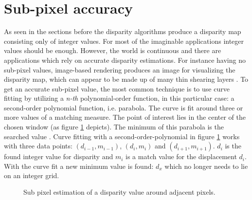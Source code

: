 \section{Sub-pixel accuracy}

As seen in the sections before the disparity algorithms produce a disparity map consisting only of integer values.
For most of the imaginable applications integer values should be enough.
However, the world is continuous and there are applications which rely on accurate disparity estimations.
For instance having no sub-pixel values, image-based rendering produces an image for visualizing the disparity map, which can appear to be made up of many thin shearing layers \citep{scharstein2002taxonomy}.
To get an accurate sub-pixel value, the most common technique is to use curve fitting by utilizing a \textit{n-th} polynomial-order function, in this particular case: a second-order polynomial function, i.e. parabola.
The curve is fit around three or more values of a matching measure.
The point of interest lies in the center of the chosen window (as figure \ref{fig:sub-pixel-estimation} depicts).
The minimum of this parabola is the searched value \citep{cyganek2011introduction, scharstein2014high}.
\newline\newline\noindent Curve fitting with a second-order-polynomial in figure \ref{fig:sub-pixel-estimation} works with three data points: $(d_{i-1}, m_{i-1})$, $(d_{i}, m_{i})$ and $(d_{i+1}, m_{i+1})$.
$d_i$ is the found integer value for disparity and $m_i$ is a match value for the displacement $d_i$.
With the curve fit a new minimum value is found: $d_x$ which no longer needs to lie on an integer grid.

\begin{figure}[h!]
  \centering
  \caption{Sub pixel estimation of a disparity value around adjacent pixels.}
  \label{fig:sub-pixel-estimation}
\end{figure}

